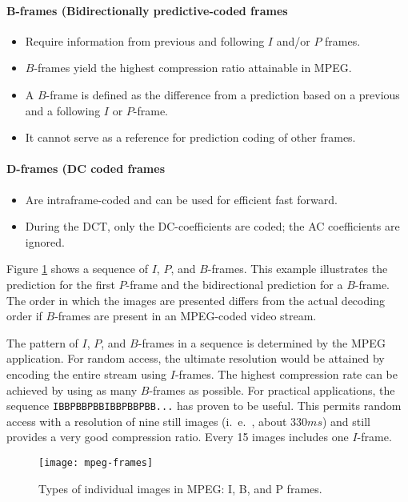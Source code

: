 \paragraph{B-frames (Bidirectionally predictive-coded frames}
\begin{itemize}
	\item Require information from previous and following $ I $ and/or $ P $ frames. 
	\item $ B $-frames yield the highest compression ratio attainable in MPEG. 
	\item A $ B $-frame is defined as the difference from a prediction based on a previous and a following $ I $ or $ P $-frame. 
	\item It cannot serve as a reference for prediction coding of other frames.
\end{itemize}


\paragraph{D-frames (DC coded frames}
\begin{itemize}
	\item Are intraframe-coded and can be used for efficient fast forward. 
	\item During the DCT, only the DC-coefficients are coded; the AC coefficients are ignored.
\end{itemize}





\noindent Figure \ref{fig:mpeg-frames} shows a sequence of $ I $, $ P $, and $ B $-frames. This example illustrates the prediction for the first $ P $-frame and the bidirectional prediction for a $ B $-frame. The order in which the images are presented differs from the actual decoding order if $ B $-frames are present in an MPEG-coded video stream.


The pattern of $ I $, $ P $, and $ B $-frames in a sequence is determined by the MPEG application. For random access, the ultimate resolution would be attained by encoding the
entire stream using $ I $-frames. The highest compression rate can be achieved by using as many $ B $-frames as possible. For practical applications, the sequence \verb|IBBPBBPBBIBBPBBPBB...| has proven to be useful. This permits random access with a resolution of nine still images (i.\ e.\ , about $ 330ms $) and still provides a very good compression ratio. Every 15 images includes one $ I $-frame.

\begin{figure}[ht!]
	\centering
	\texttt{[image: mpeg-frames]}
	\caption[Types of individual images in MPEG]{Types of individual images in MPEG: I, B, and P frames.}{\label{fig:mpeg-frames}}
\end{figure}


